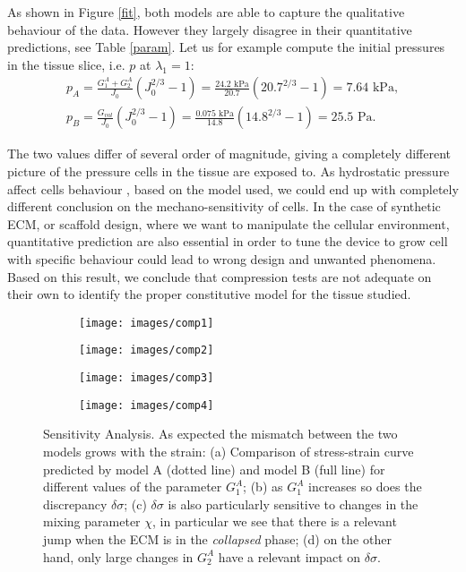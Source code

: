 As shown in Figure \ref{fit}, both models are able to capture the qualitative behaviour of the data. However they largely disagree in their quantitative predictions, see Table \ref{param}. Let us for example compute the initial pressures in the tissue slice, i.e. $p$ at $\lambda_1=1$:  
\begin{gather}
p_A = \frac{G^A_1+G^A_2}{J_0}(J_0^{2/3}-1) = \frac{24.2 \text{ kPa}}{20.7}(20.7^{2/3}-1) = 7.64 \text{ kPa},\\
p_B = \frac{G_{vol}}{J_0}(J_0^{2/3}-1) = \frac{0.075 \text{ kPa}}{14.8}(14.8^{2/3}-1) = 25.5 \text{ Pa}.
\end{gather}

The two values differ of several order of magnitude, giving a completely different picture of the pressure cells in the tissue are exposed to. As hydrostatic pressure affect cells behaviour \cite{pressure}, based on the model used, we could end up with completely different conclusion on the mechano-sensitivity of cells. In the case of synthetic ECM, or scaffold design, where we want to manipulate the cellular environment, quantitative prediction are also essential in order to tune the device to grow cell with specific behaviour could lead to wrong design and unwanted phenomena. Based on this result, we conclude that compression tests are not adequate on their own to identify the proper constitutive model for the tissue studied. 

\begin{figure}[h!]
	\begin{subfigure}{0.49\textwidth}
		\texttt{[image: images/comp1]}
		\caption{}
	\end{subfigure}
	\begin{subfigure}{0.49\textwidth}
		\texttt{[image: images/comp2]}
		\caption{}
	\end{subfigure}
	
	\begin{subfigure}{0.49\textwidth}
		\texttt{[image: images/comp3]}
		\caption{}
	\end{subfigure}
	\begin{subfigure}{0.49\textwidth}
		\texttt{[image: images/comp4]}
		\caption{}
	\end{subfigure}
	\caption{Sensitivity Analysis. As expected the mismatch between the two models grows with the strain: (a) Comparison of stress-strain curve predicted by model A (dotted line) and model B (full line) for different values of the parameter $G^A_1$; (b) as $G_1^A$ increases so does the discrepancy $\delta\sigma$; (c) $\delta\sigma$ is also particularly sensitive to changes in the mixing parameter $\chi$, in particular we see that there is a relevant jump when the ECM is in the \textit{collapsed} phase; (d) on the other hand, only large changes in $G^A_2$ have a relevant impact on $\delta\sigma$.}
	\label{comp3}
\end{figure}

